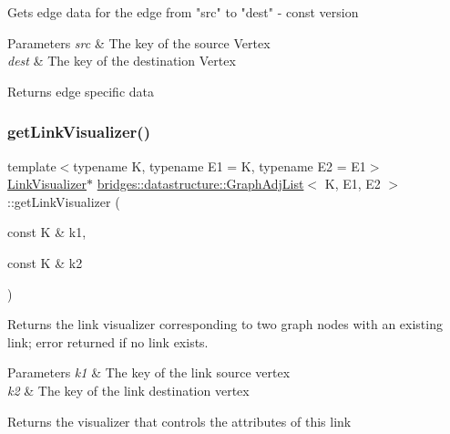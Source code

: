 \begin{DoxyVerb}Gets edge data for the edge from "src" to "dest" - const version
\end{DoxyVerb}



\begin{DoxyParams}{Parameters}
{\em src} & The key of the source Vertex \\
\hline
{\em dest} & The key of the destination Vertex\\
\hline
\end{DoxyParams}
\begin{DoxyReturn}{Returns}
edge specific data 
\end{DoxyReturn}
\mbox{\label{classbridges_1_1datastructure_1_1_graph_adj_list_ae36ba10fae403339df0c36707ed13536}} 
\subsubsection{\texorpdfstring{getLinkVisualizer()}{getLinkVisualizer()}}
{\footnotesize\ttfamily template$<$typename K, typename E1 = K, typename E2 = E1$>$ \\
\mbox{\hyperlink{classbridges_1_1datastructure_1_1_link_visualizer}{Link\+Visualizer}}$\ast$ \mbox{\hyperlink{classbridges_1_1datastructure_1_1_graph_adj_list}{bridges\+::datastructure\+::\+Graph\+Adj\+List}}$<$ K, E1, E2 $>$\+::get\+Link\+Visualizer (\begin{DoxyParamCaption}\item[{const K \&}]{k1,  }\item[{const K \&}]{k2 }\end{DoxyParamCaption})\hspace{0.3cm}{\ttfamily [inline]}}

Returns the link visualizer corresponding to two graph nodes with an existing link; error returned if no link exists.


\begin{DoxyParams}{Parameters}
{\em k1} & The key of the link source vertex \\
\hline
{\em k2} & The key of the link destination vertex\\
\hline
\end{DoxyParams}
\begin{DoxyReturn}{Returns}
the visualizer that controls the attributes of this link 
\end{DoxyReturn}
\mbox{\label{classbridges_1_1datastructure_1_1_graph_adj_list_ada58af550495cee2fe454c0be0f8504e}} 
